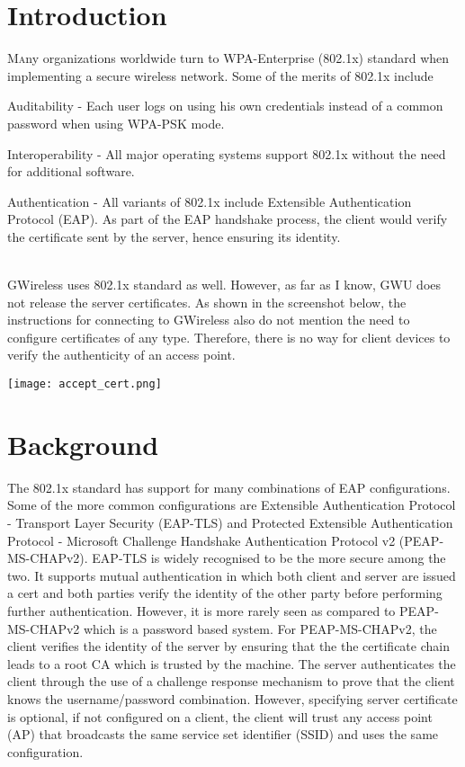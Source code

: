 \documentclass[twoside]{article}
\begin{document}
\begin{multicols}{2} 

\section{Introduction}

\lettrine[nindent=0em,lines=2]{M}any organizations worldwide turn to WPA-Enterprise (802.1x) standard when implementing a secure wireless network. Some of the merits of 802.1x include
~\\
\begin{compactitem}
\item Auditability - Each user logs on using his own credentials instead of a common password when using WPA-PSK mode.
\item Interoperability - All major operating systems support 802.1x without the need for additional software.
\item Authentication - All variants of 802.1x include Extensible Authentication Protocol (EAP). As part of the EAP handshake process, the client would verify the certificate sent by the server, hence ensuring its identity.
\end{compactitem}
~\\

GWireless uses 802.1x standard as well. However, as far as I know, GWU does not release the server certificates. As shown in the screenshot below, the instructions for connecting to GWireless also do not mention the need to configure certificates of any type. Therefore, there is no way for client devices to verify the authenticity of an access point.

\texttt{[image: accept\_cert.png]}

\pagebreak

\section{Background}

The 802.1x standard has support for many combinations of EAP configurations. Some of the more common configurations are Extensible Authentication Protocol - Transport Layer Security (EAP-TLS) and Protected Extensible Authentication Protocol - Microsoft Challenge Handshake Authentication Protocol v2 (PEAP-MS-CHAPv2). EAP-TLS is widely recognised to be the more secure among the two\cite{2}. It supports mutual authentication in which both client and server are issued a cert and both parties verify the identity of the other party before performing further authentication. However, it is more rarely seen as compared to PEAP-MS-CHAPv2 which is a password based system. For PEAP-MS-CHAPv2, the client verifies the identity of the server by ensuring that the the certificate chain leads to a root CA which is trusted by the machine. The server authenticates the client through the use of a challenge response mechanism to prove that the client knows the username/password combination. However, specifying server certificate is optional, if not configured on a client, the client will trust any access point (AP) that broadcasts the same service set identifier (SSID) and uses the same configuration.  


\end{multicols}
\end{document}
